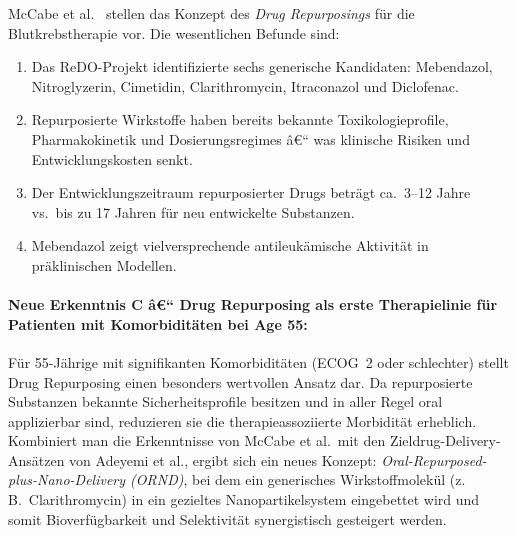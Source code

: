 ﻿\documentclass[12pt,a4paper]{article}
\theoremstyle{definition}
\begin{document}
McCabe et al.\ \cite{mccabe2015} stellen das Konzept des \emph{Drug Repurposings}
für die Blutkrebstherapie vor. Die wesentlichen Befunde sind:
\begin{enumerate}
  \item Das ReDO-Projekt identifizierte sechs generische Kandidaten: Mebendazol,
        Nitroglyzerin, Cimetidin, Clarithromycin, Itraconazol und Diclofenac.
  \item Repurposierte Wirkstoffe haben bereits bekannte Toxikologieprofile,
        Pharmakokinetik und Dosierungsregimes â€“ was klinische Risiken und
        Entwicklungskosten senkt.
  \item Der Entwicklungszeitraum repurposierter Drugs beträgt ca.\ 3--12 Jahre
        vs.\ bis zu 17 Jahren für neu entwickelte Substanzen.
  \item Mebendazol zeigt vielversprechende antileukämische Aktivität in
        präklinischen Modellen.
\end{enumerate}

\paragraph{Neue Erkenntnis C â€“ Drug Repurposing als erste Therapielinie für
Patienten mit Komorbiditäten bei Age 55:}
Für 55-Jährige mit signifikanten Komorbiditäten (ECOG~2 oder schlechter) stellt
Drug Repurposing einen besonders wertvollen Ansatz dar. Da repurposierte Substanzen
bekannte Sicherheitsprofile besitzen und in aller Regel oral applizierbar sind,
reduzieren sie die therapieassoziierte Morbidität erheblich. Kombiniert man die
Erkenntnisse von McCabe et al.\ mit den Zieldrug-Delivery-Ansätzen von Adeyemi et
al., ergibt sich ein neues Konzept: \emph{Oral-Repurposed-plus-Nano-Delivery
(ORND)}, bei dem ein generisches Wirkstoffmolekül (z.\,B.\ Clarithromycin) in ein
gezieltes Nanopartikelsystem eingebettet wird und somit Bioverfügbarkeit und
Selektivität synergistisch gesteigert werden.
\end{document}
